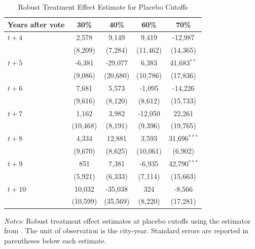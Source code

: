\begin{table}[!ht]
    \centering
    \caption{Robust Treatment Effect Estimate for Placebo Cutoffs}
    \label{tab:placebo_cutoffs}
    \begin{threeparttable}
    \begin{minipage}{\linewidth}
    \centering
    \begin{tabular}{p{3cm}cccc}
        \hline
        Years after vote & 30\% & 40\% & 60\% & 70\% \\
        \hline
        $t + 4$ & 2,578 & 9,149 & 9,419 & -12,987 \\
                & (8,209) & (7,284) & (11,462) & (14,365) \\
        $t + 5$ & -6,381 & -29,077 & 6,383 & 41,683$^{**}$ \\
                & (9,086) & (20,680) & (10,786) & (17,836) \\
        $t + 6$ & 7,681 & 5,573 & -1,095 & -14,226 \\
                & (9,616) & (8,120) & (8,612) & (15,733) \\
        $t + 7$ & 1,162 & 3,982 & -12,050 & 22,261 \\
                & (10,468) & (8,191) & (9,396) & (19,765) \\
        $t + 8$ & 4,334 & 12,881 & 3,593 & 31,696$^{***}$ \\
                & (9,670) & (8,625) & (10,061) & (6,902) \\
        $t + 9$ & 851 & 7,381 & -6,935 & 42,790$^{***}$ \\
                & (5,921) & (6,333) & (7,114) & (15,663) \\
        $t + 10$ & 10,032 & -35,038 & 324 & -8,566 \\
                 & (10,599) & (35,569) & (8,220) & (17,281) \\
        \hline
    \end{tabular}
    \vspace{0.5em}
    \begin{tablenotes}[flushleft]
        \small
        \item \textit{Notes:} Robust treatment effect estimates at placebo cutoffs using the estimator from \cite{calonico2017rdrobust}. The unit of observation is the city-year. Standard errors are reported in parentheses below each estimate.
    \end{tablenotes}
    \end{minipage}
    \end{threeparttable}
\end{table}



